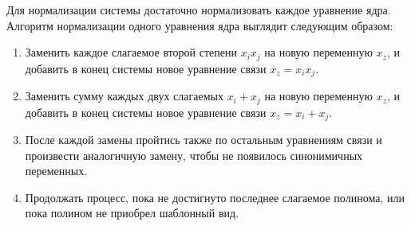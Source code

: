 Для нормализации системы достаточно нормализовать каждое уравнение ядра. Алгоритм нормализации одного уравнения ядра выглядит следующим образом:
\begin{enumerate}[1.]
	\item Заменить каждое слагаемое второй степени \(x_ix_j\) на новую переменную \(x_z\), и добавить в конец системы новое уравнение связи \(x_z=x_ix_j\).
	\item Заменить сумму каждых двух слагаемых \(x_i+x_j\) на новую переменную \(x_z\), и добавить в конец системы новое уравнение связи \(x_z=x_i+x_j\).
	\item После каждой замены пройтись также по остальным уравнениям связи и произвести аналогичную замену, чтобы не появилось синонимичных переменных.
	\item Продолжать процесс, пока не достигнуто последнее слагаемое полинома, или пока полином не приобрел шаблонный вид.
\end{enumerate} 


\newpage


%
